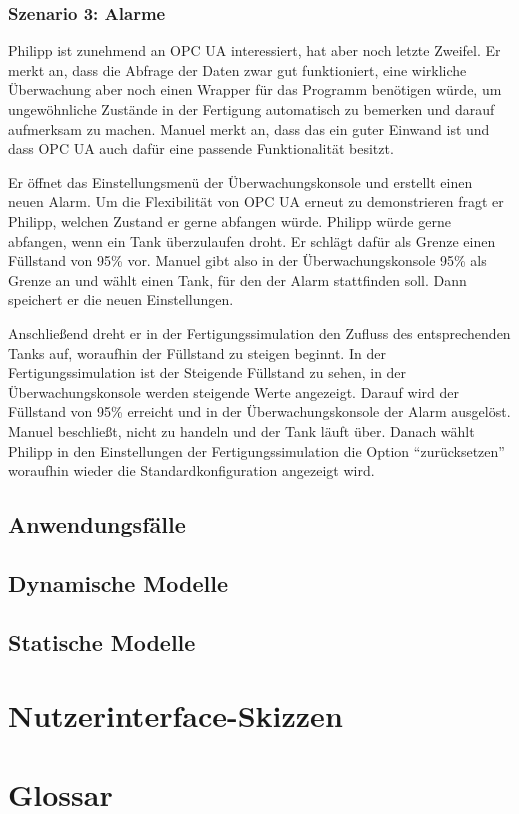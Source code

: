 \documentclass[parskip=full]{scrartcl}
\begin{document}
\subsubsection{Szenario 3: Alarme}
Philipp ist zunehmend an OPC UA interessiert, hat aber noch letzte Zweifel. Er merkt an, dass die Abfrage der Daten
zwar gut funktioniert, eine wirkliche \"Uberwachung aber noch einen Wrapper f\"ur das Programm ben\"otigen w\"urde,
um ungew\"ohnliche Zust\"ande in der Fertigung automatisch zu bemerken und darauf aufmerksam zu machen.
Manuel merkt an, dass das ein guter Einwand ist und dass OPC UA auch daf\"ur eine passende Funktionalit\"at besitzt.

Er \"offnet das Einstellungsmen\"u der \"Uberwachungskonsole und erstellt einen neuen Alarm. Um die Flexibilit\"at
von OPC UA erneut zu demonstrieren fragt er Philipp, welchen Zustand er gerne abfangen w\"urde. Philipp w\"urde gerne
abfangen, wenn ein Tank \"uberzulaufen droht. Er schl\"agt daf\"ur als Grenze einen F\"ullstand von 95\% vor.
Manuel gibt also in der \"Uberwachungskonsole 95\% als Grenze an und w\"ahlt einen Tank, f\"ur den der Alarm stattfinden soll.
Dann speichert er die neuen Einstellungen.

Anschlie{\ss}end dreht er in der Fertigungssimulation den Zufluss des entsprechenden Tanks auf, woraufhin der F\"ullstand
zu steigen beginnt. In der Fertigungssimulation ist der Steigende F\"ullstand zu sehen, in der \"Uberwachungskonsole werden
steigende Werte angezeigt.
Darauf wird der F\"ullstand von 95\% erreicht und in der \"Uberwachungskonsole der Alarm ausgel\"ost. Manuel
beschlie{\ss}t, nicht zu handeln und der Tank l\"auft \"uber. Danach w\"ahlt Philipp in den Einstellungen der
Fertigungssimulation die Option ``zur\"ucksetzen'' woraufhin wieder die Standardkonfiguration angezeigt wird.

\subsection{Anwendungsfälle}
\Blindtext[1]

\subsection{Dynamische Modelle}
\Blindtext[1]

\subsection{Statische Modelle}
\Blindtext[1]

\section{Nutzerinterface-Skizzen}
\Blindtext[1]

\section{Glossar}
\Blindtext[1]
\end{document}
